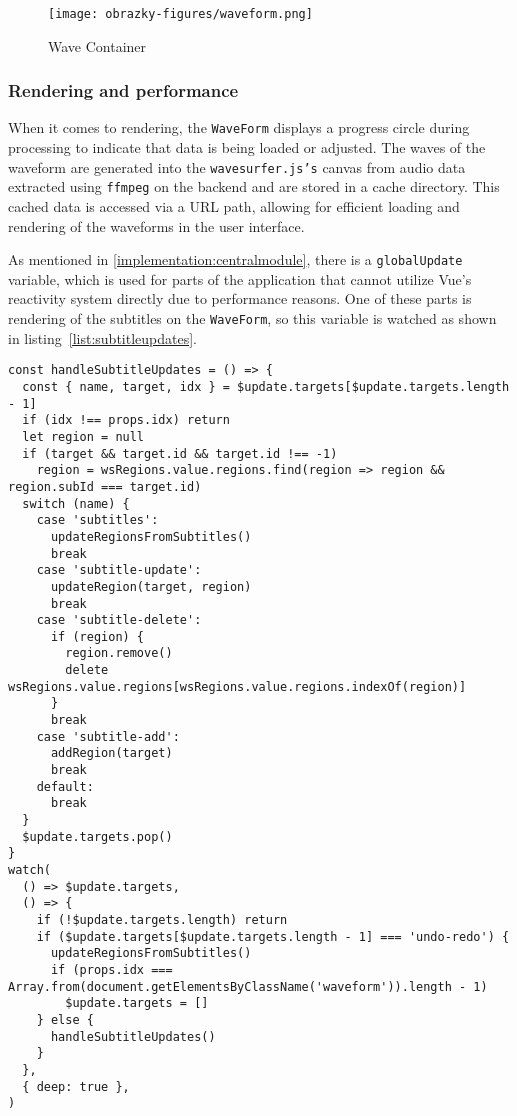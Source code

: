 \label{implement:waveform}
\begin{figure}
    \centering
    \texttt{[image: obrazky-figures/waveform.png]}
    \caption{Wave Container}
    \label{fig:waveform}
\end{figure}

\subsubsection{Rendering and performance}

When it comes to rendering, the \texttt{WaveForm} displays a progress circle during processing to indicate that data is being loaded or adjusted. The waves of the waveform are generated into the \texttt{wavesurfer.js's} canvas from audio data extracted using \texttt{ffmpeg} on the backend and are stored in a cache directory. This cached data is accessed via a URL path, allowing for efficient loading and rendering of the waveforms in the user interface.

As mentioned in \ref{implementation:centralmodule}, there is a \texttt{globalUpdate} variable, which is used for parts of the application that cannot utilize Vue's reactivity system directly due to performance reasons. One of these parts is rendering of the subtitles on the \texttt{WaveForm}, so this variable is watched as shown in listing~\ref{list:subtitleupdates}.
\label{implement:wfupdates}

\begin{clisting}
\label{list:subtitleupdates}
\begin{verbatim}
const handleSubtitleUpdates = () => {
  const { name, target, idx } = $update.targets[$update.targets.length - 1]
  if (idx !== props.idx) return
  let region = null
  if (target && target.id && target.id !== -1)
    region = wsRegions.value.regions.find(region => region && region.subId === target.id)
  switch (name) {
    case 'subtitles':
      updateRegionsFromSubtitles()
      break
    case 'subtitle-update':
      updateRegion(target, region)
      break
    case 'subtitle-delete':
      if (region) {
        region.remove()
        delete wsRegions.value.regions[wsRegions.value.regions.indexOf(region)]
      }
      break
    case 'subtitle-add':
      addRegion(target)
      break
    default:
      break
  }
  $update.targets.pop()
}
watch(
  () => $update.targets,
  () => {
    if (!$update.targets.length) return
    if ($update.targets[$update.targets.length - 1] === 'undo-redo') {
      updateRegionsFromSubtitles()
      if (props.idx === Array.from(document.getElementsByClassName('waveform')).length - 1)
        $update.targets = []
    } else {
      handleSubtitleUpdates()
    }
  },
  { deep: true },
)
\end{verbatim}
\end{clisting}

